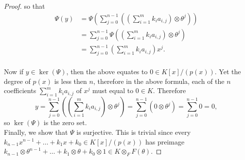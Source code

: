 \documentclass{article}
\begin{document}
\begin{proof}
    so that
    \begin{align*}
      \Psi(y) &=\Psi\left( \sum_{j=0}^{n-1} \left(\left(\sum_{i=1}^m
        k_ia_{i,j}\right) \otimes \theta^j \right)\right)\\
      &=\sum_{j=0}^{n-1} \Psi \left(\left(\sum_{i=1}^m
        k_ia_{i,j}\right) \otimes \theta^j \right)\\
      &=\sum_{j=0}^{n-1} \left(\sum_{i=1}^m k_i a_{i,j}\right) x^j.\\
    \end{align*}

    Now if $y\in\ker(\Psi)$, then the above equates to $0\in K[x]/(p(x))$.
    Yet the degree of $p(x)$ is less then $n$, therefore in the above
    formula, each of the $n$ coefficients $\sum_{i=1}^m k_i a_{i,j}$ of
    $x^j$ must equal to $0\in K$. Therefore
    \[y =\sum_{j=0}^{n-1} \left(\left(\sum_{i=1}^m k_ia_{i,j}\right)
        \otimes \theta^j \right)
      =\sum_{j=0}^{n-1} \left(0 \otimes \theta^j \right)
      =\sum_{j=0}^{n-1} 0 =0,\]
    so $\ker(\Psi)$ is the zero set. \\

    Finally, we show that $\Psi$ is surjective. This is trivial since every
    $k_{n-1}x^{n-1}+\ldots+k_1x+k_0 \in K[x]/(p(x))$ has preimage
    $k_{n-1}\otimes \theta^{n-1}+\ldots+k_1\otimes \theta+k_0\otimes 1 \in
    K\otimes_F F(\theta)$.
  \end{proof}
\end{document}

